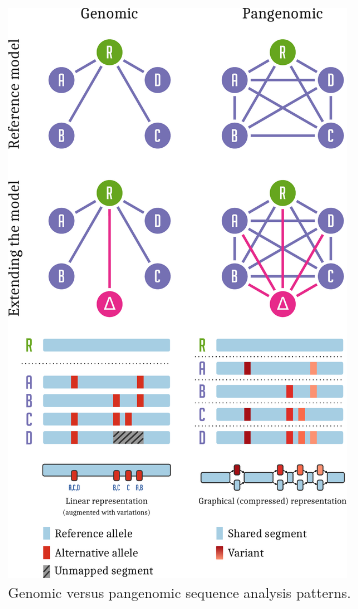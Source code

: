 

\begin{figure}[p]
    \includegraphics[width=0.8\textwidth]{figures/gen_vs_pang.pdf}
    \caption{\label{fig:genvpan} Genomic versus pangenomic sequence analysis patterns.
    }
\end{figure}

